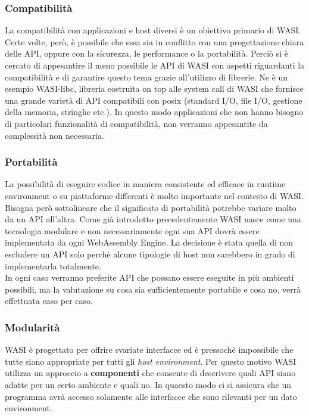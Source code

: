\subsubsection{Compatibilità}
La compatibilità con applicazioni e host diversi è un obiettivo primario di WASI. Certe volte, però, è possibile che essa sia in conflitto con una progettazione chiara delle API, oppure con la sicurezza, le performance o la portabilità.
Perciò si è cercato di appesantire il meno possibile le API di WASI con aspetti riguardanti la compatibilità e di garantire questo tema grazie all'utilizzo di librerie. Ne è un esempio WASI-libc, libreria costruita on top alle system call di WASI che fornisce una grande varietà di API compatibili con posix (standard I/O, file I/O, gestione della memoria, stringhe etc.).
In questo modo applicazioni che non hanno bisogno di particolari funzionalità di compatibilità, non verranno appesantite da complessità non necessaria.
\subsubsection{Portabilità}
La possibilità di eseguire codice in maniera consistente ed efficace in runtime environment o su piattaforme differenti è molto importante nel contesto di WASI. Bisogna però sottolineare che il significato di portabilità potrebbe variare molto da un API all'altra. Come già introdotto precedentemente WASI nasce come una tecnologia modulare e non necessariamente ogni sua API dovrà essere implementata da ogni WebAssembly Engine.
La decisione è stata quella di non escludere un API solo perchè alcune tipologie di host non sarebbero in grado di implementarla totalmente.
\\In ogni caso verranno preferite API che possano essere eseguite in più ambienti possibili, ma la valutazione su cosa sia sufficientemente portabile e cosa no, verrà effettuata caso per caso.
\subsubsection{Modularità}
WASI è progettato per offrire svariate interfacce ed è pressochè impossibile che tutte siano appropriate per tutti gli \emph{host environment}.
Per questo motivo WASI utilizza un approccio a \textbf{componenti} che consente di descrivere quali API siano adatte per un certo ambiente e quali no.
In quaesto modo ci si assicura che un programma avrà accesso solamente alle interfacce che sono rilevanti per un dato environment.
